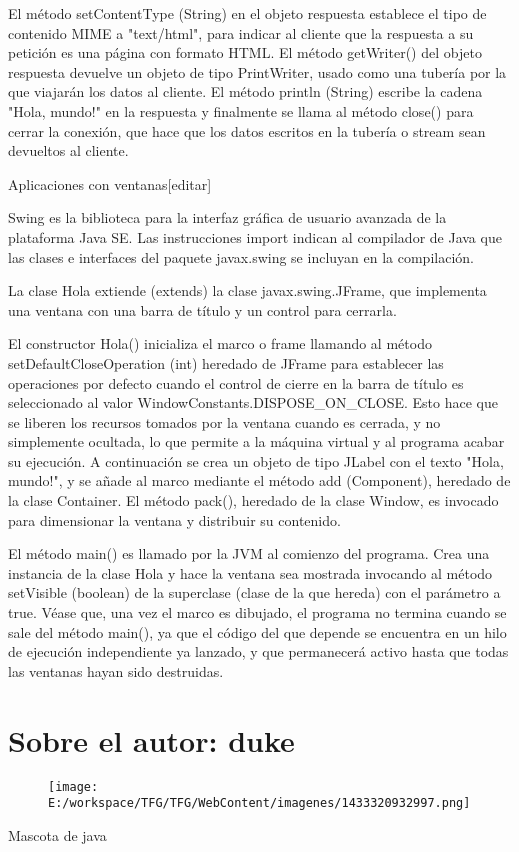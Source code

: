 \documentclass[11pt,a4paper]{book}
\begin{document}
	\bigskip
							El método setContentType (String) en el objeto respuesta establece el tipo de contenido MIME a "text/html", para indicar al cliente que la respuesta a su petición es una página con formato HTML. El método getWriter() del objeto respuesta devuelve un objeto de tipo PrintWriter, usado como una tubería por la que viajarán los datos al cliente. El método println (String) escribe la cadena "Hola, mundo!" en la respuesta y finalmente se llama al método close() para cerrar la conexión, que hace que los datos escritos en la tubería o stream sean devueltos al cliente.
	\bigskip
							
	\bigskip
							Aplicaciones con ventanas[editar]
	\bigskip
							
	\bigskip
							Swing es la biblioteca para la interfaz gráfica de usuario avanzada de la plataforma Java SE.
	\bigskip
							Las instrucciones import indican al compilador de Java que las clases e interfaces del paquete javax.swing se incluyan en la compilación.
	\bigskip
							
	\bigskip
							La clase Hola extiende (extends) la clase javax.swing.JFrame, que implementa una ventana con una barra de título y un control para cerrarla.
	\bigskip
							
	\bigskip
							El constructor Hola() inicializa el marco o frame llamando al método setDefaultCloseOperation (int) heredado de JFrame para establecer las operaciones por defecto cuando el control de cierre en la barra de título es seleccionado al valor WindowConstants.DISPOSE\_ON\_CLOSE. Esto hace que se liberen los recursos tomados por la ventana cuando es cerrada, y no simplemente ocultada, lo que permite a la máquina virtual y al programa acabar su ejecución. A continuación se crea un objeto de tipo JLabel con el texto "Hola, mundo!", y se añade al marco mediante el método add (Component), heredado de la clase Container. El método pack(), heredado de la clase Window, es invocado para dimensionar la ventana y distribuir su contenido.
	\bigskip
							
	\bigskip
							El método main() es llamado por la JVM al comienzo del programa. Crea una instancia de la clase Hola y hace la ventana sea mostrada invocando al método setVisible (boolean) de la superclase (clase de la que hereda) con el parámetro a true. Véase que, una vez el marco es dibujado, el programa no termina cuando se sale del método main(), ya que el código del que depende se encuentra en un hilo de ejecución independiente ya lanzado, y que permanecerá activo hasta que todas las ventanas hayan sido destruidas.
	\bigskip
			
			\chapter{Sobre el autor: duke}
						\begin{figure}[hbtp]
		\centering
		\texttt{[image: E:/workspace/TFG/TFG/WebContent/imagenes/1433320932997.png]}
	\end{figure}
								Mascota de java
	\bigskip
			
\end{document}
